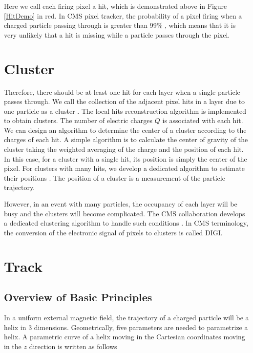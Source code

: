 Here we call each firing pixel a hit, which is demonstrated above in Figure \ref{HitDemo} in red. In CMS pixel tracker, the probability of a pixel firing when a charged particle passing through is greater than 99\% \cite{CMSTrackComp}, which means that it is very unlikely that a hit is missing while a particle passes through the pixel. 



\section{Cluster}


Therefore, there should be at least one hit for each layer when a single particle passes through. We call the collection of the adjacent pixel hits in a layer due to one particle as a cluster \cite{CMSTrackComp}. The local hits reconstruction algorithm is implemented to obtain clusters. The number of electric charges $Q$ is associated with each hit. We can design an algorithm to determine the center of a cluster according to the charges of each hit. A simple algorithm is to calculate the center of gravity of the cluster taking the weighted averaging of the charge and the position of each hit. In this case, for a cluster with a single hit, its position is simply the center of the pixel. For clusters with many hits, we develop a dedicated algorithm to estimate their positions \cite{CMSTrackComp}. The position of a cluster is a measurement of the particle trajectory. 

However, in an event with many particles, the occupancy of each layer will be busy and the clusters will become complicated. The CMS collaboration develops a dedicated clustering algorithm to handle such conditions \cite{ClusAlgo}. In CMS terminology, the conversion of the electronic signal of pixels to clusters is called DIGI.


\section{Track}

\subsection{Overview of Basic Principles}

In a uniform external magnetic field, the trajectory of a charged particle will be a helix in 3 dimensions. Geometrically, five parameters are needed to parametrize a helix. A parametric curve of a helix moving in the Cartesian coordinates moving in the $z$ direction is written as follows

